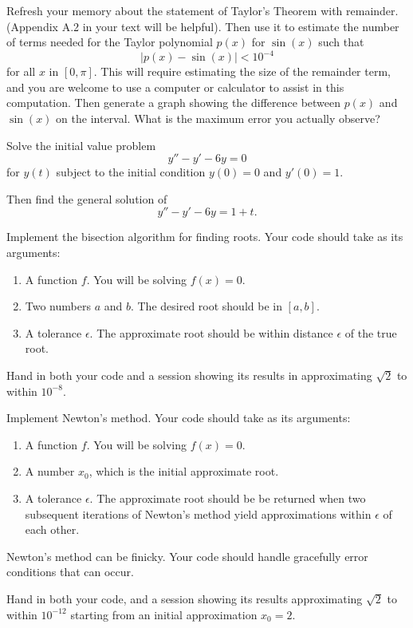 \documentclass[minion]{homework}
\begin{document}
\begin{problems}

\problem Refresh your memory about the statement of Taylor's Theorem
with remainder.  (Appendix A.2 in your text will be helpful).  Then
use it to estimate the number of terms needed for the Taylor polynomial $p(x)$ for $\sin(x)$ such that
\[
|p(x)-\sin(x)|< 10^{-4}
\]
for all $x$ in $[0,\pi]$.  This will require estimating the size
of the remainder term, and you are welcome to use a computer or calculator to assist in this computation.  Then generate a graph
showing the difference between $p(x)$ and $\sin(x)$ on
the interval.  What is the maximum error you actually observe?

\problem  Solve the initial value problem
\[
y''-y'-6y = 0
\]
for $y(t)$ subject to the initial condition $y(0)=0$ and
$y'(0)=1$.

Then find the general solution of
\[
y''-y'-6y = 1 + t.
\]

\problem Implement the bisection algorithm for finding roots.
Your code should take as its arguments:
\begin{enumerate}
	\item A function $f$.  You will be solving $f(x)=0$.
	\item Two numbers $a$ and $b$.  The desired root should be in $[a,b]$.
	\item A tolerance $\epsilon$.  The approximate root should be within distance $\epsilon$ of the true root.
\end{enumerate}
Hand in both your code and a session showing its results in
approximating $\sqrt{2}$ to within $10^{-8}$.

\problem Implement Newton's method. 
Your code should take as its arguments:
\begin{enumerate}
	\item A function $f$.  You will be solving $f(x)=0$.
	\item A number $x_0$, which is the initial approximate root.
	\item A tolerance $\epsilon$.  The approximate root should be be returned when two subsequent iterations of Newton's method yield
	approximations within $\epsilon$ of each other.
\end{enumerate}
Newton's method can be finicky.  Your code should handle gracefully
error conditions that can occur.

Hand in both your code, and a session showing its results 
approximating $\sqrt{2}$ to within $10^{-12}$ starting from an initial approximation $x_0=2$.

\end{problems}
\end{document}
